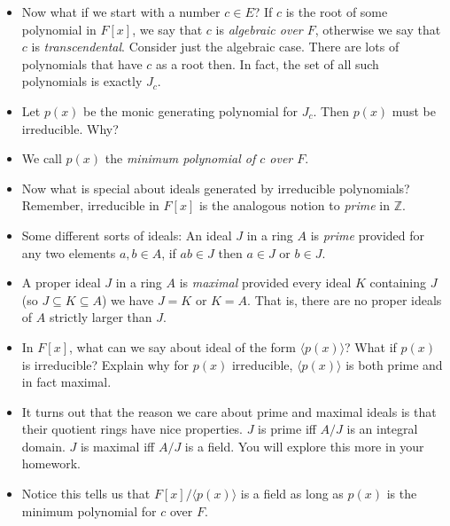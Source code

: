 \documentclass[12pt]{article}
\theoremstyle{plain}
\theoremstyle{definition}
\theoremstyle{remark}
\def\Z{\mathbb Z}
\begin{document}
\begin{itemize}
\item Now what if we start with a number $c \in E$? If $c$ is the root of some polynomial in $F[x]$, we say that $c$ is \emph{algebraic over $F$}, otherwise we say that $c$ is \emph{transcendental}.  Consider just the algebraic case.  There are lots of polynomials that have $c$ as a root then.  In fact, the set of all such polynomials is exactly $J_c$.

\item Let $p(x)$ be the monic generating polynomial for $J_c$.  Then $p(x)$ must be irreducible.  Why?  

\item We call $p(x)$ the \emph{minimum polynomial of $c$ over $F$}.

\item Now what is special about ideals generated by irreducible polynomials?  Remember, irreducible in $F[x]$ is the analogous notion to \emph{prime} in $\Z$.  

\item Some different sorts of ideals: An ideal $J$ in a ring $A$ is \emph{prime} provided for any two elements $a, b \in A$, if $ab \in J$ then $a \in J$ or $b \in J$.

\item A proper ideal $J$ in a ring $A$ is \emph{maximal} provided every ideal $K$ containing $J$ (so $J \subseteq K \subseteq A$) we have $J = K$ or $K = A$.  That is, there are no proper ideals of $A$ strictly larger than $J$.

\item In $F[x]$, what can we say about ideal of the form $\langle p(x) \rangle$?  What if $p(x)$ is irreducible?  Explain why for $p(x)$ irreducible, $\langle p(x) \rangle$ is both prime and in fact maximal.

\item It turns out that the reason we care about prime and maximal ideals is that their quotient rings have nice properties.  $J$ is prime iff $A/J$ is an integral domain.  $J$ is maximal iff $A/J$ is a field.  You will explore this more in your homework.

\item Notice this tells us that $F[x]/\langle p(x)\rangle$ is a field as long as $p(x)$ is the minimum polynomial for $c$ over $F$.  


\end{itemize}
\end{document}
